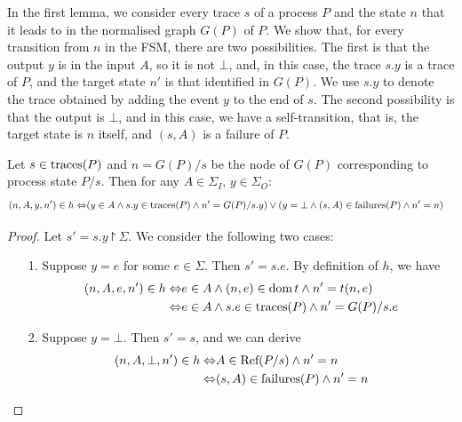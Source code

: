 In the first lemma, we consider every trace $s$ of a process $P$ and the
state $n$ that it leads to in the normalised graph $G(P)$ of $P$. We show
that, for every transition from $n$ in the FSM, there are two possibilities.
The first is that the output $y$ is in the input $A$, so it is not $\bot$,
and, in this case, the trace $s.y$ is a trace of $P$, and the target state
$n'$ is that identified in $G(P)$. We use $s.y$ to denote the trace obtained
by adding the event $y$ to the end of $s$. The second possibility is that the
output is $\bot$, and in this case, we have a self-transition, that is, the
target state is $n$ itself, and $(s,A)$ is a failure of $P$.
%
\begin{lemma}\label{tran}
Let $s\in \text{traces}(P)$ and $n=G(P)/s$ be the node of $G(P)$ corresponding to
process state $P/s$. Then for any $A \in \Sigma_I$, $y\in \Sigma_O\colon$
\begin{align*}
  (n,A,y,n')\in h\Leftrightarrow & (y\in A\wedge s.y\in \text{traces}(P)\wedge n'=G(P)/s.y)\vee(y=\bot \wedge (s,A)\in {\text {\rm failures}}(P)\wedge n'=n)\end{align*}
\end{lemma}
\begin{proof}
  Let $s'=s.y\project \Sigma$.
  We consider the following two cases:
  \begin{itemize}
    \item[1.] Suppose $y=e$ for some $e\in \Sigma$. Then $s'=s.e$. By definition of $h$, we have
    \begin{align*}
      (n,A,e,n')\in h\Leftrightarrow & e\in A\wedge (n,e)\in {\text{\rm dom}}\, t\wedge n'=t(n,e)
      \\
      \Leftrightarrow& e\in A \wedge s.e\in \text{traces}(P)\wedge n'=G(P)/s.e
    \end{align*}
    \item[2.] Suppose $y=\bot$. Then $s'=s$, and we can derive
    \begin{align*}
      (n,A,\bot,n')\in h\Leftrightarrow & A \in {\text {\rm Ref}}(P/s)\wedge n'=n
      \\
      \Leftrightarrow & (s,A) \in {\text {\rm failures}}(P)\wedge n'=n
    \end{align*}
  \end{itemize}
\end{proof}


